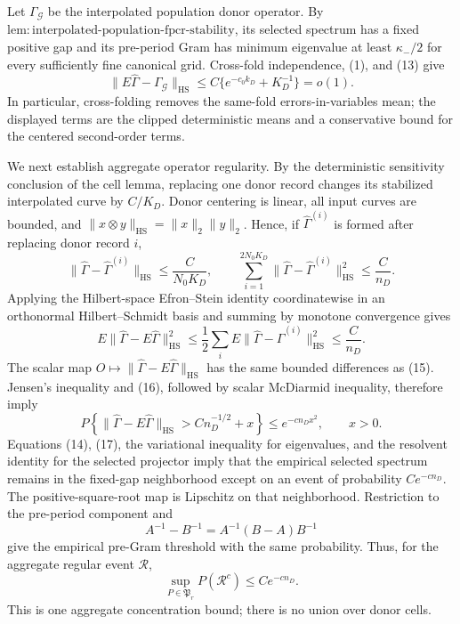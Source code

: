 Let \(\Gamma_{\mathcal G}\) be the interpolated population donor operator.
By
\(\mathrm{lem:interpolated\mbox{-}population\mbox{-}fpcr\mbox{-}stability}\),
its selected spectrum has a fixed positive gap and its pre-period Gram has
minimum eigenvalue at least \(\kappa_-/2\) for every sufficiently fine
canonical grid.  Cross-fold independence, (1), and (13) give
\[
 \|E\widehat\Gamma-\Gamma_{\mathcal G}\|_{\mathrm{HS}}
 \leq C\{e^{-c_0k_D}+K_D^{-1}\}=o(1).                   \tag{14}
\]
In particular, cross-folding removes the same-fold errors-in-variables mean;
the displayed terms are the clipped deterministic means and a conservative
bound for the centered second-order terms.

We next establish aggregate operator regularity.  By the deterministic
sensitivity conclusion of the cell lemma, replacing one donor record changes
its stabilized interpolated curve by \(C/K_D\).  Donor centering is linear,
all input curves are bounded, and
\(\|x\otimes y\|_{\mathrm{HS}}=\|x\|_2\|y\|_2\).  Hence, if
\(\widehat\Gamma^{(i)}\) is formed after replacing donor record \(i\),
\[
 \|\widehat\Gamma-\widehat\Gamma^{(i)}\|_{\mathrm{HS}}
 \leq\frac{C}{N_0K_D},
 \qquad
 \sum_{i=1}^{2N_0K_D}
 \|\widehat\Gamma-\widehat\Gamma^{(i)}\|_{\mathrm{HS}}^2
 \leq\frac{C}{n_D}.                                     \tag{15}
\]
Applying the Hilbert-space Efron--Stein identity coordinatewise in an
orthonormal Hilbert--Schmidt basis and summing by monotone convergence gives
\[
 E\|\widehat\Gamma-E\widehat\Gamma\|_{\mathrm{HS}}^2
 \leq\frac12\sum_iE
 \|\widehat\Gamma-\widehat\Gamma^{(i)}\|_{\mathrm{HS}}^2
 \leq\frac{C}{n_D}.                                     \tag{16}
\]
The scalar map
\(O\mapsto\|\widehat\Gamma-E\widehat\Gamma\|_{\mathrm{HS}}\) has the
same bounded differences as (15).  Jensen's inequality and (16), followed by
scalar McDiarmid inequality, therefore imply
\[
 P\left\{\|\widehat\Gamma-E\widehat\Gamma\|_{\mathrm{HS}}
 >Cn_D^{-1/2}+x\right\}
 \leq e^{-cn_Dx^2},
 \qquad x>0.                                             \tag{17}
\]
Equations (14), (17), the variational inequality for eigenvalues, and the
resolvent identity for the selected projector imply that the empirical
selected spectrum remains in the fixed-gap neighborhood except on an event
of probability \(Ce^{-cn_D}\).  The positive-square-root map is Lipschitz on
that neighborhood.  Restriction to the pre-period component and
\[
 A^{-1}-B^{-1}=A^{-1}(B-A)B^{-1}                          \tag{18}
\]
give the empirical pre-Gram threshold with the same probability.  Thus, for
the aggregate regular event \(\mathcal R\),
\[
 \sup_{P\in\mathfrak P_r}P(\mathcal R^c)\leq Ce^{-cn_D}. \tag{19}
\]
This is one aggregate concentration bound; there is no union over donor cells.

